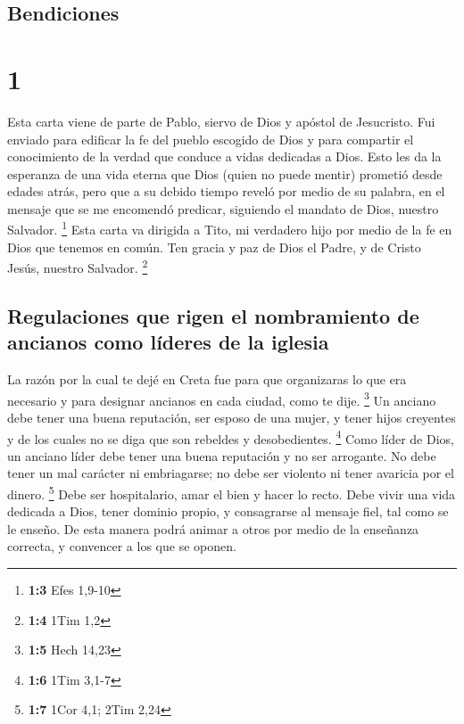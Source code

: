 \hypertarget{bendiciones}{%
\subsection{Bendiciones}\label{bendiciones}}

\hypertarget{section}{%
\section{1}\label{section}}

 Esta carta viene de parte de Pablo, siervo de Dios y
apóstol de Jesucristo. Fui enviado para edificar la fe del pueblo
escogido de Dios y para compartir el conocimiento de la verdad que
conduce a vidas dedicadas a Dios.  Esto les da la
esperanza de una vida eterna que Dios (quien no puede mentir) prometió
desde edades atrás,  pero que a su debido tiempo reveló
por medio de su palabra, en el mensaje que se me encomendó predicar,
siguiendo el mandato de Dios, nuestro Salvador. \footnote{\textbf{1:3}
  Efes 1,9-10}  Esta carta va dirigida a Tito, mi
verdadero hijo por medio de la fe en Dios que tenemos en común. Ten
gracia y paz de Dios el Padre, y de Cristo Jesús, nuestro Salvador.
\footnote{\textbf{1:4} 1Tim 1,2}

\hypertarget{regulaciones-que-rigen-el-nombramiento-de-ancianos-como-luxedderes-de-la-iglesia}{%
\subsection{Regulaciones que rigen el nombramiento de ancianos como
líderes de la
iglesia}\label{regulaciones-que-rigen-el-nombramiento-de-ancianos-como-luxedderes-de-la-iglesia}}

 La razón por la cual te dejé en Creta fue para que
organizaras lo que era necesario y para designar ancianos en cada
ciudad, como te dije. \footnote{\textbf{1:5} Hech 14,23} 
Un anciano debe tener una buena reputación, ser esposo de una mujer, y
tener hijos creyentes y de los cuales no se diga que son rebeldes y
desobedientes. \footnote{\textbf{1:6} 1Tim 3,1-7}  Como
líder de Dios, un anciano líder debe tener una buena reputación y no ser
arrogante. No debe tener un mal carácter ni embriagarse; no debe ser
violento ni tener avaricia por el dinero. \footnote{\textbf{1:7} 1Cor
  4,1; 2Tim 2,24}  Debe ser hospitalario, amar el bien y
hacer lo recto. Debe vivir una vida dedicada a Dios, tener dominio
propio,  y consagrarse al mensaje fiel, tal como se le
enseño. De esta manera podrá animar a otros por medio de la enseñanza
correcta, y convencer a los que se oponen.

